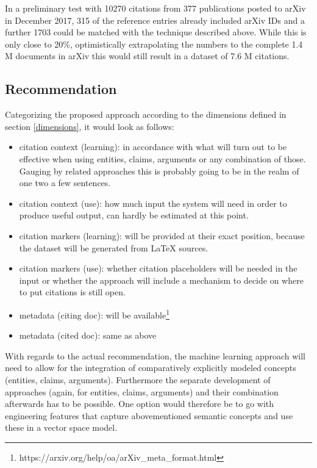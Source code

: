 \documentclass{proseminar}
\begin{document}
In a preliminary test with 10270 citations from 377 publications posted to arXiv in December 2017, 315 of the reference entries already included arXiv IDs and a further 1703 could be matched with the technique described above. While this is only close to 20\%, optimistically extrapolating the numbers to the complete 1.4 M documents in arXiv this would still result in a dataset of 7.6 M citations.

\subsection{Recommendation}
Categorizing the proposed approach according to the dimensions defined in section \ref{dimensions}, it would look as follows:

\begin{itemize}
    \item citation context (learning): in accordance with what will turn out to be effective when using entities, claims, arguments or any combination of those. Gauging by related approaches this is probably going to be in the realm of one two a few sentences.
    \item citation context (use): how much input the system will need in order to produce useful output, can hardly be estimated at this point.
    \item citation markers (learning): will be provided at their exact position, because the dataset will be generated from LaTeX sources.
    \item citation markers (use): whether citation placeholders will be needed in the input or whether the approach will include a mechanism to decide on where to put citations is still open.
    \item metadata (citing doc): will be available\footnote{https://arxiv.org/help/oa/arXiv\_meta\_format.html}
    \item metadata (cited doc): same as above
\end{itemize}

With regards to the actual recommendation, the machine learning approach will need to allow for the integration of comparatively explicitly modeled concepts (entities, claims, arguments). Furthermore the separate development of approaches (again, for entities, claims, arguments) and their combination afterwards has to be possible. One option would therefore be to go with engineering features that capture abovementioned semantic concepts and use these in a vector space model.
\end{document}
